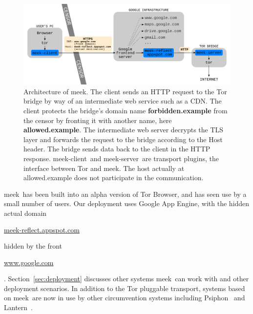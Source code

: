 \documentclass[conference]{IEEEtran}
\def\meekclient{\mbox{meek-client}}
\def\meekserver{\mbox{meek-server}}
\def\meek{meek}
\def\urll#1{\begin{NoHyper}\url{#1}\end{NoHyper}}
\begin{document}
\begin{figure}
\centering
\includegraphics[width=\linewidth]{architecture}
\caption{
Architecture of \meek.
The client sends an HTTP request to the Tor bridge by way of an intermediate web service such as a CDN.
The client protects the bridge's domain name \textbf{forbidden.example} from the censor
by fronting it with another name, here \textbf{allowed.example}.
The intermediate web server decrypts the TLS layer and forwards the request to the bridge
according to the Host header.
The bridge sends data back to the client in the HTTP response.
\meekclient\ and \meekserver\ are transport plugins, the interface between Tor and \meek.
The host actually at allowed.example does not participate in the communication.
}
\label{fig:architecture}
\end{figure}

\meek\ has been built into an alpha version of Tor Browser,
and has seen use by a small number of users.
Our deployment uses Google App Engine,
with the hidden actual domain \urll{meek-reflect.appspot.com}
hidden by the front \urll{www.google.com}.
Section~\ref{sec:deployment} discusses other systems \meek\ can work with
and other deployment scenarios.
In addition to the Tor pluggable transport,
systems based on \meek\ are now in use by other circumvention systems
including Psiphon~\cite{psiphon} and Lantern~\cite{lantern}.

\end{document}
